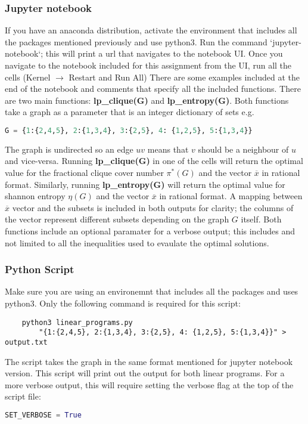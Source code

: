 \documentclass[11pt]{article}
\begin{document}
    \subsubsection*{Jupyter notebook}
    If you have an anaconda distribution, activate the environment that includes all the packages mentioned previously and use python3. Run the command `jupyter-notebook`; this will print a url that navigates to the notebook UI. Once you navigate to the notebook included for this assignment from the UI, run all the cells (Kernel $\to$ Restart and Run All) There are some examples included at the end of the notebook and comments that specify all the included functions. There are two main functions: \textbf{lp\_clique(G)} and \textbf{lp\_entropy(G)}. Both functions take a graph as a parameter that is an integer dictionary of sets e.g. 
    \begin{lstlisting}[language=Python]
    G = {1:{2,4,5}, 2:{1,3,4}, 3:{2,5}, 4: {1,2,5}, 5:{1,3,4}}
    \end{lstlisting}
    The graph is undirected so an edge $uv$ means that $v$ should be a neighbour of $u$ and vice-versa. 
    Running \textbf{lp\_clique(G)} in one of the cells will return the optimal value for the fractional clique cover number $\pi^*(G)$ and the vector $\overline{x}$ in rational format. Similarly, running \textbf{lp\_entropy(G)} will return the optimal value for shannon entropy $\eta(G)$ and the vector $\overline{x}$ in rational format. A mapping between $\overline{x}$ vector and the subsets is included in both outputs for clarity; the columns of the vector represent different subsets depending on the graph $G$ itself. Both functions include an optional paramater for a verbose output; this includes and not limited to all the inequalities used to evaulate the optimal solutions. 
    \subsubsection*{Python Script}
    Make sure you are using an environemnt that includes all the packages and uses python3. Only the following command is required for this script:
    \begin{lstlisting}
    python3 linear_programs.py 
        "{1:{2,4,5}, 2:{1,3,4}, 3:{2,5}, 4: {1,2,5}, 5:{1,3,4}}" > output.txt
    \end{lstlisting}
    The script takes the graph in the same format mentioned for jupyter notebook version. This script will print out the output for both linear programs. For a more verbose output, this will require setting the verbose flag at the top of the script file:
    \begin{lstlisting}[language=Python]
    SET_VERBOSE = True
    \end{lstlisting}
    
\end{document}
